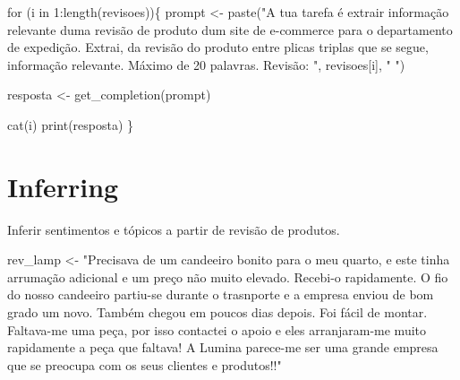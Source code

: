\documentclass[
  letterpaper,
  paper=6in:9in,
  pagesize=pdftex,
  headinclude=on,
  footinclude=on,
  12pt]{scrbook}
\newenvironment{Shaded}{\begin{snugshade}}{\end{snugshade}}
\newcommand{\ControlFlowTok}[1]{\textcolor[rgb]{0.00,0.23,0.31}{#1}}
\newcommand{\DecValTok}[1]{\textcolor[rgb]{0.68,0.00,0.00}{#1}}
\newcommand{\FunctionTok}[1]{\textcolor[rgb]{0.28,0.35,0.67}{#1}}
\newcommand{\NormalTok}[1]{\textcolor[rgb]{0.00,0.23,0.31}{#1}}
\newcommand{\OtherTok}[1]{\textcolor[rgb]{0.00,0.23,0.31}{#1}}
\newcommand{\SpecialCharTok}[1]{\textcolor[rgb]{0.37,0.37,0.37}{#1}}
\newcommand{\StringTok}[1]{\textcolor[rgb]{0.13,0.47,0.30}{#1}}
\begin{document}
\begin{Shaded}
\begin{Highlighting}[]
\ControlFlowTok{for}\NormalTok{ (i }\ControlFlowTok{in} \DecValTok{1}\SpecialCharTok{:}\FunctionTok{length}\NormalTok{(revisoes))\{}
\NormalTok{  prompt }\OtherTok{\textless{}{-}} \FunctionTok{paste}\NormalTok{(}\StringTok{"A tua tarefa é extrair informação relevante duma revisão de produto dum site de e{-}commerce }
\StringTok{  para o departamento de expedição.}
\StringTok{                 Extrai, da revisão do produto entre plicas triplas que se segue, }
\StringTok{                 informação relevante. Máximo de 20 palavras.}
\StringTok{                 Revisão: \textquotesingle{}\textquotesingle{}\textquotesingle{} "}\NormalTok{, revisoes[i], }\StringTok{" \textquotesingle{}\textquotesingle{}\textquotesingle{} "}\NormalTok{)}

\NormalTok{resposta }\OtherTok{\textless{}{-}} \FunctionTok{get\_completion}\NormalTok{(prompt)}

\FunctionTok{cat}\NormalTok{(i)}
\FunctionTok{print}\NormalTok{(resposta)}
\NormalTok{\} }
\end{Highlighting}
\end{Shaded}


\hypertarget{inferring}{%
\chapter{Inferring}\label{inferring}}

Inferir sentimentos e tópicos a partir de revisão de produtos.

\begin{Shaded}
\begin{Highlighting}[]
\NormalTok{rev\_lamp }\OtherTok{\textless{}{-}} \StringTok{"Precisava de um candeeiro bonito para o meu quarto, e este tinha }
\StringTok{arrumação adicional e um preço não muito elevado. }
\StringTok{Recebi{-}o rapidamente.  O fio do nosso candeeiro partiu{-}se durante o trasnporte }
\StringTok{e a empresa enviou de bom grado um novo. Também chegou em poucos dias depois. }
\StringTok{Foi fácil de montar.  Faltava{-}me uma peça, por isso contactei o apoio }
\StringTok{e eles arranjaram{-}me muito rapidamente a peça que faltava! }
\StringTok{A Lumina parece{-}me ser uma grande empresa que se preocupa com os seus clientes e produtos!!"}
\end{Highlighting}
\end{Shaded}
\end{document}
